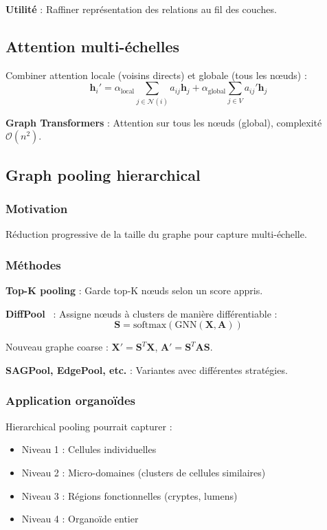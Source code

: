 \textbf{Utilité} : Raffiner représentation des relations au fil des couches.

\subsection{Attention multi-échelles}

Combiner attention locale (voisins directs) et globale (tous les nœuds) :
\[
\mathbf{h}_i' = \alpha_{\text{local}} \sum_{j \in \mathcal{N}(i)} a_{ij} \mathbf{h}_j + \alpha_{\text{global}} \sum_{j \in V} a_{ij}' \mathbf{h}_j
\]

\textbf{Graph Transformers} : Attention sur tous les nœuds (global), complexité $\mathcal{O}(n^2)$.

\subsection{Graph pooling hierarchical}

\subsubsection{Motivation}

Réduction progressive de la taille du graphe pour capture multi-échelle.

\subsubsection{Méthodes}

\textbf{Top-K pooling} : Garde top-K nœuds selon un score appris.

\textbf{DiffPool}~\cite{Ying2018} : Assigne nœuds à clusters de manière différentiable :
\[
\mathbf{S} = \text{softmax}(\text{GNN}(\mathbf{X}, \mathbf{A}))
\]

Nouveau graphe coarse : $\mathbf{X}' = \mathbf{S}^T \mathbf{X}$, $\mathbf{A}' = \mathbf{S}^T \mathbf{A} \mathbf{S}$.

\textbf{SAGPool, EdgePool, etc.} : Variantes avec différentes stratégies.

\subsubsection{Application organoïdes}

Hierarchical pooling pourrait capturer :
\begin{itemize}
    \item Niveau 1 : Cellules individuelles
    \item Niveau 2 : Micro-domaines (clusters de cellules similaires)
    \item Niveau 3 : Régions fonctionnelles (cryptes, lumens)
    \item Niveau 4 : Organoïde entier
\end{itemize}

